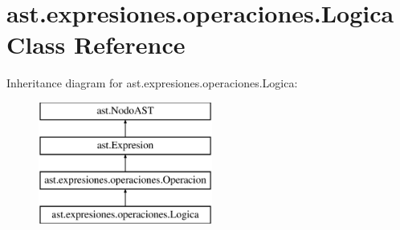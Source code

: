 \hypertarget{classast_1_1expresiones_1_1operaciones_1_1_logica}{}\section{ast.\+expresiones.\+operaciones.\+Logica Class Reference}
\label{classast_1_1expresiones_1_1operaciones_1_1_logica}
Inheritance diagram for ast.\+expresiones.\+operaciones.\+Logica\+:\begin{figure}[H]
\begin{center}
\leavevmode
\includegraphics[height=4.000000cm]{classast_1_1expresiones_1_1operaciones_1_1_logica}
\end{center}
\end{figure}
